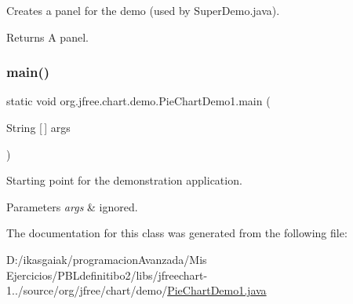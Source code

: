 Creates a panel for the demo (used by Super\+Demo.\+java).

\begin{DoxyReturn}{Returns}
A panel. 
\end{DoxyReturn}
\mbox{\label{classorg_1_1jfree_1_1chart_1_1demo_1_1_pie_chart_demo1_aa3e31ac830dd8f13202b78f5dfb647e6}} 
\subsubsection{\texorpdfstring{main()}{main()}}
{\footnotesize\ttfamily static void org.\+jfree.\+chart.\+demo.\+Pie\+Chart\+Demo1.\+main (\begin{DoxyParamCaption}\item[{String \mbox{[}$\,$\mbox{]}}]{args }\end{DoxyParamCaption})\hspace{0.3cm}{\ttfamily [static]}}

Starting point for the demonstration application.


\begin{DoxyParams}{Parameters}
{\em args} & ignored. \\
\hline
\end{DoxyParams}


The documentation for this class was generated from the following file\+:\begin{DoxyCompactItemize}
\item 
D\+:/ikasgaiak/programacion\+Avanzada/\+Mis Ejercicios/\+P\+B\+Ldefinitibo2/libs/jfreechart-\/1../source/org/jfree/chart/demo/\mbox{\hyperlink{_pie_chart_demo1_8java}{Pie\+Chart\+Demo1.\+java}}\end{DoxyCompactItemize}
